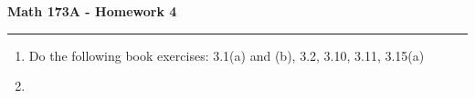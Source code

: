 \documentclass[11pt,letterpaper]{article}
\begin{document}
\begin{center}
{\bf \Large Math 173A - Homework 4}
\vspace{0.2cm}
\hrule
\end{center}



\begin{enumerate}

\item Do the following book exercises: 3.1(a) and (b), 3.2, 3.10, 3.11, 3.15(a)


\item 
    

\end{enumerate}
\end{document}
